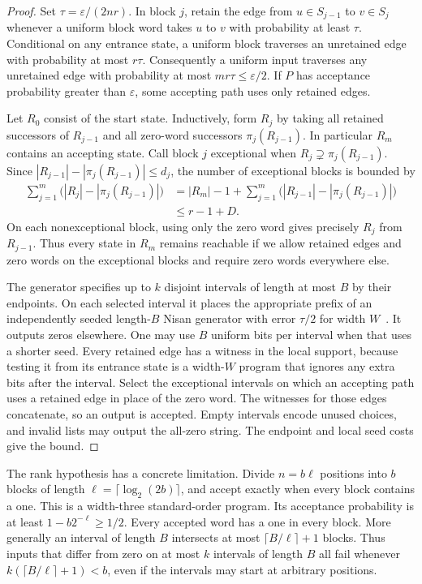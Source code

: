 \documentclass[11pt]{article}
\begin{document}
\begin{proof}
Set $\tau=\varepsilon/(2nr)$. In block $j$, retain the edge from
$u\in S_{j-1}$ to $v\in S_j$ whenever a uniform block word takes
$u$ to $v$ with probability at least $\tau$. Conditional on any
entrance state, a uniform block traverses an unretained edge with
probability at most $r\tau$. Consequently a uniform input traverses
any unretained edge with probability at most $mr\tau\le\varepsilon/2$.
If $P$ has acceptance probability greater than $\varepsilon$, some
accepting path uses only retained edges.

Let $R_0$ consist of the start state. Inductively, form $R_j$ by
taking all retained successors of $R_{j-1}$ and all zero-word
successors $\pi_j(R_{j-1})$. In particular $R_m$ contains an
accepting state. Call block $j$ exceptional when
$R_j\supsetneq\pi_j(R_{j-1})$. Since
$|R_{j-1}|-|\pi_j(R_{j-1})|\le d_j$, the number of exceptional
blocks is bounded by
\begin{align*}
 \sum_{j=1}^m \bigl(|R_j|-|\pi_j(R_{j-1})|\bigr)
 &= |R_m|-1
    +\sum_{j=1}^m\bigl(|R_{j-1}|-|\pi_j(R_{j-1})|\bigr)\\
 &\le r-1+D.
\end{align*}
On each nonexceptional block, using only the zero word gives precisely
$R_j$ from $R_{j-1}$. Thus every state in $R_m$ remains reachable if
we allow retained edges and zero words on the exceptional blocks and
require zero words everywhere else.

The generator specifies up to $k$ disjoint intervals of length at most
$B$ by their endpoints. On each selected interval it places the
appropriate prefix of an independently seeded length-$B$ Nisan
generator with error $\tau/2$ for width $W$~\cite{Nisan}. It outputs
zeros elsewhere. One may use $B$ uniform bits per interval when that
uses a shorter seed. Every retained edge has a witness in the local
support, because testing it from its entrance state is a width-$W$
program that ignores any extra bits after the interval. Select the
exceptional intervals on which an accepting path uses a retained edge
in place of the zero word. The witnesses for those edges concatenate,
so an output is accepted. Empty intervals encode unused choices, and
invalid lists may output the all-zero string. The endpoint and local
seed costs give the bound.
\end{proof}

The rank hypothesis has a concrete limitation. Divide $n=b\ell$
positions into $b$ blocks of length $\ell=\lceil\log_2(2b)\rceil$,
and accept exactly when every block contains a one. This is a
width-three standard-order program. Its acceptance probability is at
least $1-b2^{-\ell}\ge1/2$. Every accepted word has a one in every
block. More generally an interval of length $B$ intersects at most
$\lceil B/\ell\rceil+1$ blocks. Thus inputs that differ from zero on
at most $k$ intervals of length $B$ all fail whenever
$k(\lceil B/\ell\rceil+1)<b$, even if the intervals may start at
arbitrary positions.
\end{document}
